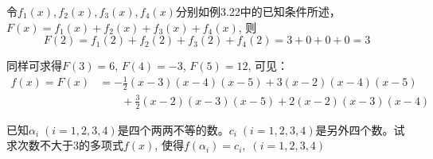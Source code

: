 \begin{solution}
  令$f_1(x),f_2(x),f_3(x),f_4(x)$分别如例3.22中的已知条件所述，$F(x)=f_1(x)+f_2(x)+f_3(x)+f_4(x)$, 则
\[    F (2) =f_1 (2) +f_2 (2) +f_3 (2) +f_4 (2) =3+0+0+0=3\]

    同样可求得$F(3)=6$, $F(4)=-3$, $F(5)=12$, 可见：
\[\begin{split}
    f(x)=F(x)&=-\frac{1}{2} (x-3) (x-4)(x-5)+3 (x-2) (x-4)(x-5)\\
    &\qquad 
    +\frac{3}{2} (x-2) (x-3)(x-5)
   +2 (x-2) (x-3)(x-4)   
\end{split}\]    
\end{solution}



\begin{example}
    已知$\alpha_i\; (i=1, 2, 3, 4)$是四个两两不等的数。$c_i\; (i=1, 2, 3, 4)$是另外四个数。试求次数不大于3的多项式$f(x)$, 使得$f (\alpha_i) =c_i,\; (i=1, 2, 3, 4)$ 
\end{example}

